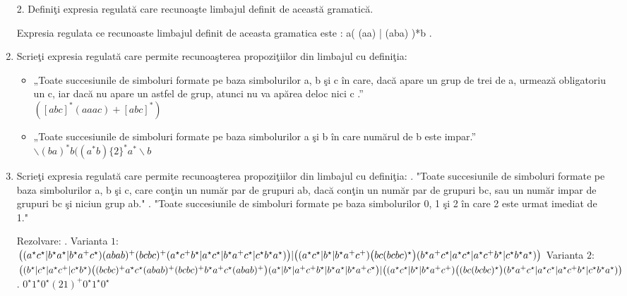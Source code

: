 \begin{enumerate}
2. Definiţi expresia regulată care recunoaşte limbajul definit de această gramatică.

Expresia regulata ce recunoaste limbajul definit de aceasta gramatica este : a( (aa) | (aba) )*b .


\item
Scrieţi expresia regulată care permite recunoaşterea propoziţiilor din limbajul cu definiţia:
\begin{itemize}
\item „Toate succesiunile de simboluri formate pe baza simbolurilor a, b şi c în care, dacă apare un grup de trei de a, urmează obligatoriu un c, iar dacă nu apare un astfel de grup, atunci nu va apărea deloc nici c .”
\\$([abc]^*(aaac)+[abc]^*)$
\item „Toate succesiunile de simboluri formate pe baza simbolurilor a şi b în care numărul de b este impar.”
\\$\backslash (ba)^*b((a^*b)\{2\}^*a^*\backslash b$
\end{itemize}

\item
Scrieţi expresia regulată care permite recunoaşterea propoziţiilor din limbajul cu definiţia:
. "Toate succesiunile de simboluri formate pe baza simbolurilor a, b şi c, care conţin un număr par de grupuri ab, dacă conţin un număr par de grupuri bc, sau un număr impar de grupuri bc şi niciun grup ab."
. "Toate succesiunile de simboluri formate pe baza simbolurilor 0, 1 şi 2 în care 2 este urmat imediat de 1."

\par Rezolvare:
. Varianta $1$:
\newline $\big((a^\star c^\star| b^\star a^\star | b^\star a^+ c^\star)(abab)^+(bcbc)^+(a^\star c^+ b^\star | a^\star c^\star | b^\star a^+ c^\star | c^\star b^\star a^\star)\big)|\big((a^\star c^\star | b^\star | b^\star a^+ c^+)
\newline\big(bc(bcbc)^\star\big)(b^\star a^+ c^\star | a^\star c^\star | a^\star c^+ b^\star | c^\star b^\star a^\star)\big)$
\newline Varianta $2$:
\newline $\big((b^\star | c^\star | a^\star c^+ | c^\star b^\star)\big((bcbc)^+ a^\star c^\star (abab)^+(bcbc)^+ b^\star a^+ c^\star (abab)^+\big)(a^\star | b^\star | a^+ c^+ b^\star | b^\star a^\star |
\newline b^\star a^+ c^\star\big) |  \big((a^\star c^\star | b^\star | b^\star a^+ c^+)\big((bc(bcbc)^\star\big)(b^\star a^+ c^\star | a^\star c^\star | a^\star c^+ b^\star | c^\star b^\star a^\star)\big)$
.
\newline $0^\star1^\star0^\star(21)^+0^\star1^\star 0^\star$


\end{enumerate}
